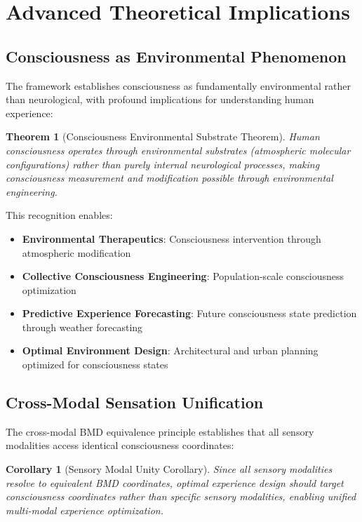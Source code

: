\documentclass[12pt,a4paper]{article}
\newtheorem{theorem}{Theorem}
\newtheorem{corollary}{Corollary}
\begin{document}
\section{Advanced Theoretical Implications}

\subsection{Consciousness as Environmental Phenomenon}

The framework establishes consciousness as fundamentally environmental rather than neurological, with profound implications for understanding human experience:

\begin{theorem}[Consciousness Environmental Substrate Theorem]
Human consciousness operates through environmental substrates (atmospheric molecular configurations) rather than purely internal neurological processes, making consciousness measurement and modification possible through environmental engineering.
\end{theorem}

This recognition enables:
\begin{itemize}
\item \textbf{Environmental Therapeutics}: Consciousness intervention through atmospheric modification
\item \textbf{Collective Consciousness Engineering}: Population-scale consciousness optimization
\item \textbf{Predictive Experience Forecasting}: Future consciousness state prediction through weather forecasting
\item \textbf{Optimal Environment Design}: Architectural and urban planning optimized for consciousness states
\end{itemize}

\subsection{Cross-Modal Sensation Unification}

The cross-modal BMD equivalence principle establishes that all sensory modalities access identical consciousness coordinates:

\begin{corollary}[Sensory Modal Unity Corollary]
Since all sensory modalities resolve to equivalent BMD coordinates, optimal experience design should target consciousness coordinates rather than specific sensory modalities, enabling unified multi-modal experience optimization.
\end{corollary}
\end{document}
